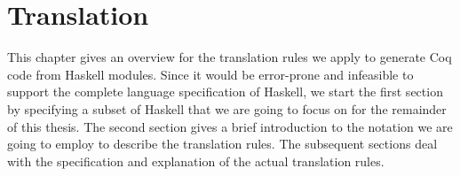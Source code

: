 \chapter{Translation} \label{chp:translation}

This chapter gives an overview for the translation rules we apply to generate Coq code from Haskell modules.
Since it would be error-prone and infeasible to support the complete language specification of Haskell, we start the first section by specifying a subset of Haskell that we are going to focus on for the remainder of this thesis.
The second section gives a brief introduction to the notation we are going to employ to describe the translation rules.
The subsequent sections deal with the specification and explanation of the actual translation rules.







